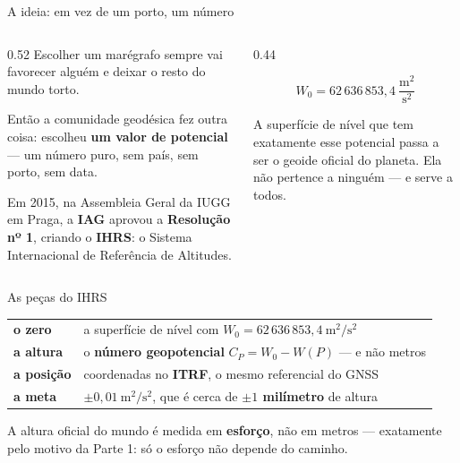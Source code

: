 \documentclass[aspectratio=169,11pt]{beamer}
\newcommand{\bnum}[1]{\textbf{\textcolor{mTeal}{#1}}}
\begin{document}
\begin{frame}{A ideia: em vez de um porto, um número}
  \begin{columns}[T]
    \begin{column}{0.52\textwidth}
      Escolher um marégrafo sempre vai favorecer alguém e deixar o resto do mundo torto.
      \medskip

      Então a comunidade geodésica fez outra coisa: escolheu \bnum{um valor de potencial}
      --- um número puro, sem país, sem porto, sem data.
      \medskip

      Em 2015, na Assembleia Geral da IUGG em Praga, a \textbf{IAG} aprovou a
      \textbf{Resolução nº 1}, criando o \bnum{IHRS}: o Sistema Internacional de
      Referência de Altitudes.
    \end{column}
    \begin{column}{0.44\textwidth}
      \begin{ideia}[title={O zero do mundo}]
        \centering
        \[ W_0 = 62\,636\,853{,}4\ \frac{\text{m}^2}{\text{s}^2} \]
      \end{ideia}
      \medskip

      {\small A superfície de nível que tem exatamente esse potencial passa a ser
      \alert{o geoide oficial do planeta}. Ela não pertence a ninguém --- e serve a todos.}
    \end{column}
  \end{columns}
\end{frame}

\begin{frame}{As peças do IHRS}
  \centering
  \small
  \renewcommand{\arraystretch}{1.45}
  \begin{tabular}{lp{7.4cm}}
    \toprule
    \textbf{o zero} & a superfície de nível com $W_0 = 62\,636\,853{,}4\ \text{m}^2/\text{s}^2$ \\
    \textbf{a altura} & o \bnum{número geopotencial} $C_P = W_0 - W(P)$ --- e não metros \\
    \textbf{a posição} & coordenadas no \textbf{ITRF}, o mesmo referencial do GNSS \\
    \textbf{a meta} & $\pm 0{,}01\ \text{m}^2/\text{s}^2$, que é cerca de
      \bnum{$\pm 1$ milímetro} de altura \\
    \bottomrule
  \end{tabular}
  \bigskip

  \begin{ideia}[title={Repare na escolha}]
    A altura oficial do mundo é medida em \bnum{esforço}, não em metros --- exatamente
    pelo motivo da Parte 1: só o esforço não depende do caminho.
  \end{ideia}
\end{frame}
\end{document}
